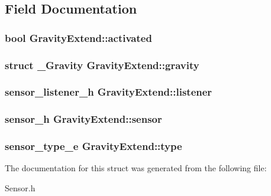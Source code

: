 \subsection{Field Documentation}
\subsubsection[{activated}]{\setlength{\rightskip}{0pt plus 5cm}bool Gravity\-Extend\-::activated}\label{structGravityExtend_a10519b5bee99a4e642ce476f9c60a4c9}
\subsubsection[{gravity}]{\setlength{\rightskip}{0pt plus 5cm}struct {\bf \-\_\-\-Gravity} Gravity\-Extend\-::gravity}\label{structGravityExtend_a20b0cf3dfc0a3bef728e30515beff6c1}
\subsubsection[{listener}]{\setlength{\rightskip}{0pt plus 5cm}sensor\-\_\-listener\-\_\-h Gravity\-Extend\-::listener}\label{structGravityExtend_a466d5e3ce0c1b61936a80070b8262d14}
\subsubsection[{sensor}]{\setlength{\rightskip}{0pt plus 5cm}sensor\-\_\-h Gravity\-Extend\-::sensor}\label{structGravityExtend_aade450fe1af8252a52d0988265e5568e}
\subsubsection[{type}]{\setlength{\rightskip}{0pt plus 5cm}sensor\-\_\-type\-\_\-e Gravity\-Extend\-::type}\label{structGravityExtend_abf8a80847b4906232a8155b14cc81ce4}


The documentation for this struct was generated from the following file\-:\begin{DoxyCompactItemize}
\item 
Sensor.\-h\end{DoxyCompactItemize}
